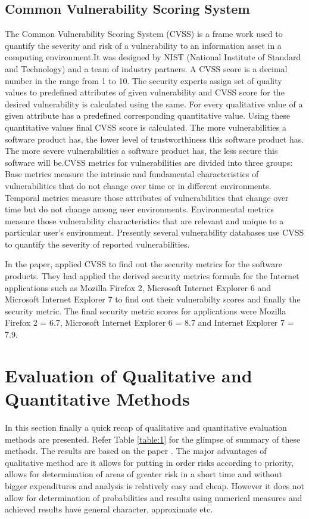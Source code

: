 \documentclass[pdftex,english,oribibl]{llncs}
\begin{document}
\subsection{Common Vulnerability Scoring System}
The Common Vulnerability Scoring System (CVSS) is a frame work used to quantify the severity and risk of a vulnerability to an information asset in a computing environment.It was designed by NIST (National Institute of Standard and Technology) and a team of industry partners. A CVSS score is a decimal number in the range from 1 to 10. The security experts assign set of quality values to predefined attributes of given vulnerability and CVSS score for the desired vulnerability is calculated using the same. For every qualitative value of a given attribute has a predefined corresponding quantitative value. Using these quantitative values final CVSS score is calculated. The more vulnerabilities a software product has, the lower level of trustworthiness this software product has. The more severe vulnerabilities a software product has, the less secure this software will be.CVSS metrics for vulnerabilities are divided into three groups: Base metrics measure the intrinsic and fundamental characteristics of vulnerabilities that do not change over time or in different environments. Temporal metrics measure those attributes of vulnerabilities that change over time but do not change among user environments. Environmental metrics measure those vulnerability characteristics that are relevant and unique to a particular user's environment. Presently several vulnerability databases use CVSS to quantify the severity of reported vulnerabilities.

In the paper, \cite{Wang:2009:SMS:1566445.1566509} applied CVSS to find out the security metrics for the software products. They had applied the derived security metrics formula for the Internet applications such as Mozilla Firefox 2, Microsoft Internet Explorer 6  and Microsoft Internet Explorer 7 to find out their vulnerabilty scores and finally the security metric. The final security metric scores for applications were Mozilla Firefox 2 = 6.7, Microsoft Internet Explorer 6 = 8.7 and Internet Explorer 7 = 7.9. 

\section{Evaluation of Qualitative and Quantitative Methods}
In this section finally a quick recap of qualitative and quantitative evaluation methods are presented. Refer Table \ref{table:1} for the glimpse of summary of these methods. The results are based on the paper \cite{Rot_itrisk}. The major advantages of qualitative method are it allows for putting in order risks according to priority, allows for determination of areas of greater risk in a short time and without bigger expenditures and analysis is relatively easy and cheap. However it does not allow for determination of probabilities and results using numerical measures and achieved results have general character, approximate etc.
\end{document}
